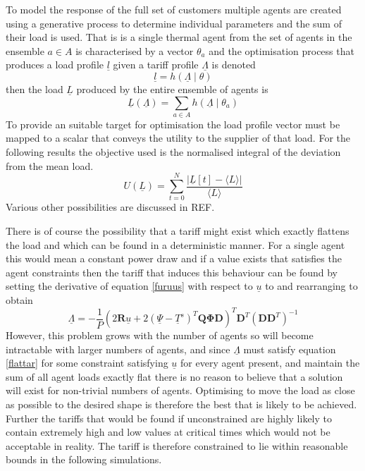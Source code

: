 \documentclass[a4paper, 10 pt, conference]{ieeeconf}  %
\begin{document}
To model the response of the full set of customers multiple agents are created using a generative process to determine individual parameters and the sum of their load is used. That is is a single thermal agent from the set of agents in the ensemble $a \in A$ is characterised by a vector $\theta_{a}$ and the optimisation process that produces a load profile $\underline{l}$ given a tariff profile $\underline{\Lambda}$ is denoted
\begin{equation}
\underline{l}=h(\underline{\Lambda} \mid \theta)
\end{equation}
then the load $\underline{L}$ produced by the entire ensemble of agents is
\begin{equation}
\underline{L}(\underline{\Lambda}) = \sum_{a \in A} h(\underline{\Lambda} \mid \theta_{a})
\end{equation}
To provide an suitable target for optimisation the load profile vector must be mapped to a scalar that conveys the utility to the supplier of that load. For the following results the objective used is the normalised integral of the deviation from the mean load.
\begin{equation}
U(\underline{L})=\sum_{t=0}^{N} \frac{\left| \underline{L}[t]-\langle L \rangle \right|}{\langle L \rangle}
\end{equation}
Various other possibilities are discussed in REF.

There is of course the possibility that a tariff might exist which exactly flattens the load and which can be found in a deterministic manner. For a single agent this would mean a constant power draw and if a value exists that satisfies the agent constraints then the tariff that induces this behaviour can be found by setting the derivative of equation \ref{furuus} with respect to $\underline{u}$ to and rearranging to obtain
\begin{equation}
\label{flattar}
\underline{\Lambda} = -\frac{1}{P}\left( 2\mathbf{R}\underline{u} + 2(\underline{\Psi}-\underline{T}^s)^{T}\mathbf{Q}\boldsymbol{\Phi}\mathbf{D}\right)^{T}\mathbf{D}^T(\mathbf{DD}^{T})^{-1}
\end{equation}
However, this problem grows with the number of agents so will become intractable with larger numbers of agents, and since $\underline{\Lambda}$ must satisfy equation \ref{flattar} for some constraint satisfying $\underline{u}$ for every agent present, and maintain the sum of all agent loads exactly flat there is no reason to believe that a solution will exist for non-trivial numbers of agents. Optimising to move the load as close as possible to the desired shape is therefore the best that is likely to be achieved. Further the tariffs that would be found if unconstrained are highly likely to contain extremely high and low values at critical times which would not be acceptable in reality. The tariff is therefore constrained to lie within reasonable bounds in the following simulations.
\end{document}
